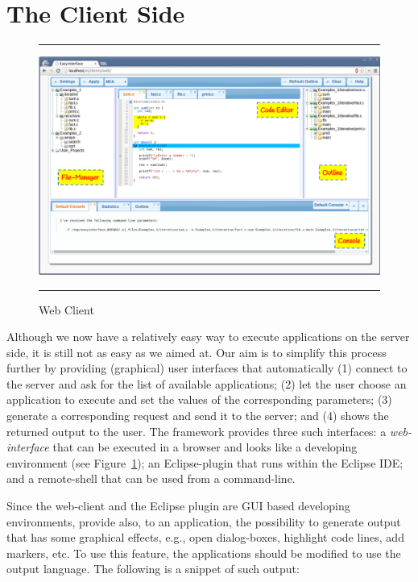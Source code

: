 \section{The Client Side}
\label{ch:overview:arch:client}

\begin{figure}[t]
\hrule\smallskip
\begin{center}
\includegraphics[width=1\textwidth]{fig/webclient.pdf}
\end{center}
\caption{\ei Web Client}
\label{fig:webclient}
\hrule
\end{figure}

Although we now have a relatively easy way to execute applications on
the server side, it is still not as easy as we aimed at.
%
Our aim is to simplify this process further by providing (graphical)
user interfaces that automatically (1) connect to the \ei server and
ask for the list of available applications; (2) let the user choose an
application to execute and set the values of the corresponding
parameters; (3) generate a corresponding request and send it to the
\ei server; and (4) shows the returned output to the user.
%
The \ei framework provides three such interfaces: a
\emph{web-interface} that can be executed in a browser and looks like
a developing environment (see Figure~\ref{fig:webclient}); an
Eclipse-plugin that runs within the Eclipse IDE; and a remote-shell
that can be used from a command-line.

Since the web-client and the Eclipse plugin are GUI based developing
environments, \ei provide also, to an application, the possibility to
generate output that has some graphical effects, e.g., open
dialog-boxes, highlight code lines, add markers, etc. To use this
feature, the applications should be modified to use the \ei output
language. The following is a snippet of such output:

